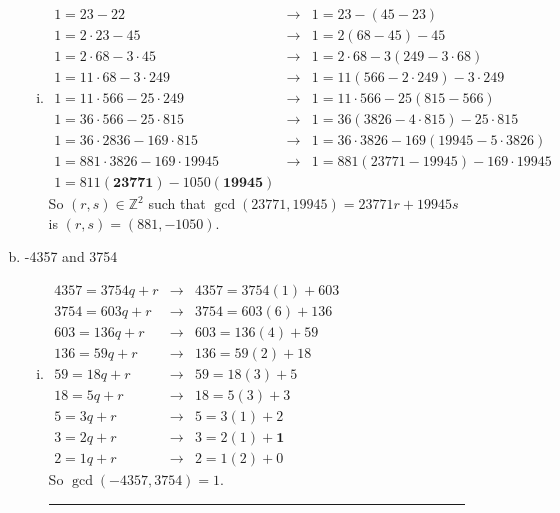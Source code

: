\documentclass{article}
\begin{document}
\begin{description}
\begin{enumerate}[(a)]
\begin{enumerate}[(i)]
					
					\item$\begin{array}{ccc}
					1=23-22&  \to&  1=23-(45-23)\\ 
					1=2\cdot23-45& \to &  1=2(68-45)-45\\ 
					1=2\cdot68-3\cdot45& \to &  1=2\cdot68-3(249-3\cdot68)\\ 
					1=11\cdot68-3\cdot249& \to &  1=11(566-2\cdot249)-3\cdot249\\ 
					1=11\cdot566-25\cdot249&	\to&	1=11\cdot566-25(815-566)\\
					1=36\cdot566-25\cdot815& \to &  1=36(3826-4\cdot815)-25\cdot815\\ 
					1=36\cdot2836-169\cdot815& \to &  1=36\cdot3826-169(19945-5\cdot3826)\\ 
					1=881\cdot3826-169\cdot19945& \to &  1=881(23771-19945)-169\cdot19945\\ 
					1=811(\mathbf{23771})-1050(\mathbf{19945})
					\end{array}  $ \\ So $(r,s)\in\mathbb{Z}^2$ such that $\gcd(23771,19945)=23771r+19945s$ is $(r,s)=(881,-1050)$.  
 		\end{enumerate}	
			\item -4357 and 3754
				\begin{enumerate}[(i)]
					\item
					$\begin{array}{ccc}
					4357=3754q+r&  \to&  4357=3754(1)+603\\ 
					3754=603q+r&  \to&  3754=603(6)+136\\ 
					603=136q+r&  \to&  603=136(4)+59\\ 
					136=59q+r&  \to&  136=59(2)+18\\ 
					59=18q+r&  \to&  59=18(3)+5\\ 
					18=5q+r&  \to&  18=5(3)+3\\ 
					5=3q+r& \to &5=3(1)+2  \\ 
					3=2q+r&  \to&  3=2(1)+\mathbf{1}\\ 
					2=1q+r&  \to& 2=1(2)+0
					\end{array} $  \\ So $\gcd{(-4357,3754)}=1$.\\ \noindent\rule{10cm}{0.4pt}
					

\end{enumerate}
\end{enumerate}
\end{description}
\end{document}
